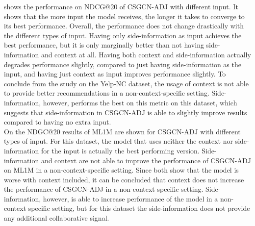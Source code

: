 shows the performance on NDCG@20 of CSGCN-ADJ with different input.
It shows that the more input the model receives, the longer it takes to converge to its best performance.
Overall, the performance does not change drastically with the different types of input.
Having only side-information as input achieves the best performance, but it is only marginally better than not having side-information and context at all.
Having both context and side-information actually degrades performance slightly, compared to just having side-information as the input, and having just context as input improves performance slightly.
To conclude from the study on the Yelp-NC dataset, the usage of context is not able to provide better recommendations in a non-context-specific setting.
Side-information, however, performs the best on this metric on this dataset, which suggests that side-information in CSGCN-ADJ is able to slightly improve results compared to having no extra input.
\\
On  the NDGC@20 results of ML1M are shown for CSGCN-ADJ with different types of input. 
For this dataset, the model that uses neither the context nor side-information for the input is actually the best performing version.
Side-information and context are not able to improve the performance of CSGCN-ADJ on ML1M in a non-context-specific setting.
Since both  show that the model is worse with context included, it can be concluded that context does not increase the performance of CSGCN-ADJ in a non-context specific setting.
Side-information, however, is able to increase performance of the model in a non-context specific setting, but for this dataset the side-information does not provide any additional collaborative signal.

